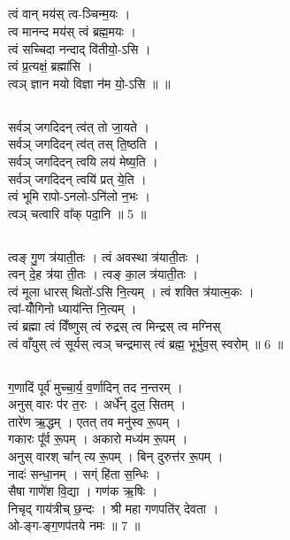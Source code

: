\subsection{}
त्वं वान् मय॑स् त्व-ञ्चिन्म॒यः ।\\
त्व मानन्द मय॑स् त्वं ब्रह्म॒मयः ।\\
त्वं सच्चिदा नन्दाद् वि॑तीयो॒-ऽसि ।\\
त्वं प्र॒त्यक्षं॒ ब्रह्मा॑सि ।\\
त्वञ् ज्ञान मयो विज्ञा न॑म यो॒-ऽसि ॥   ॥\\
\subsection{}
सर्वञ् जगदिदन् त्व॑त् तो जा॒यते ।\\
सर्वञ् जगदिदन् त्व॑त् तस् ति॒ष्ठति ।\\
सर्वञ् जगदिदन् त्वयि लय॑ मेष्य॒ति ।\\
सर्वञ् जगदिदन् त्वयि॑ प्रत् ये॒ति ।\\
त्वं भूमि रापो-ऽनलो-ऽनि॑लो न॒भः ।\\
त्वञ् चत्वारि वा᳚क् पदा॒नि ॥ 5 ॥\\
\subsection{}
त्वङ् गु॒ण त्र॑याती॒तः । त्वं अवस्था त्र॑याती॒तः ।\\
त्वन् दे॒ह त्र॑या ती॒तः । त्वङ् का॒ल त्र॑याती॒तः ।\\
त्वं मूला धारस् थितो॑-ऽसि नि॒त्यम् । त्वं शक्ति त्र॑यात्म॒कः ।\\
त्वां-योँगिनो ध्याय॑न्ति नि॒त्यम् ।\\
त्वं ब्रह्मा त्वं विँष्णुस् त्वं रुद्रस् त्व मिन्द्रस् त्व मग्निस् \\
त्वं वाँयुस् त्वं सूर्यस् त्वञ् चन्द्रमास् त्वं ब्रह्म॒ भूर्भुव॒स् स्वरोम् ॥  6 ॥\\
\subsection{}
ग॒णादिं पूर्व॑ मुच्चा॒र्य॒ व॒र्णादिन् तद न॒न्तरम् ।\\
अनुस् वारः प॑र त॒रः । अर्धे᳚न् दुल॒ सितम् ।\\
तारे॑ण ऋ॒द्धम् । एतत् तव मनु॑स्व रू॒पम् ।\\
गकारः पू᳚र्व रू॒पम् । अकारो मध्य॑म रू॒पम् ।\\
अनुस् वारश् चा᳚न् त्य रू॒पम् । बिन् दुरुत्त॑र रू॒पम् ।\\
नादः॑ सन्धा॒नम् । सग्ं हि॑ता स॒न्धिः ।\\
सैषा गाणे॑श वि॒द्या । गण॑क ऋ॒षिः ।\\
निचृद् गाय॑त्रीच् छ॒न्दः । श्री महा गणपति॑र् देवता ।\\
ओ-ङ्ग-ङ्ग॒णप॑तये नमः ॥ 7 ॥\\
